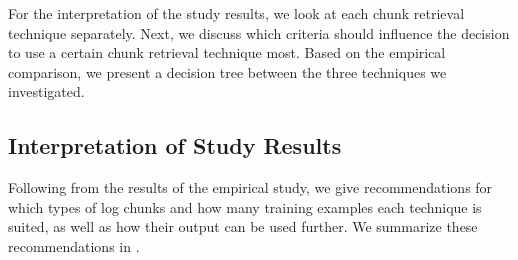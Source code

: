 For the interpretation of the study results, we look at each chunk
retrieval technique separately.
Next, we discuss
which criteria should influence the decision to use a certain
chunk retrieval technique most.
Based on the empirical comparison, we present a
decision tree between the three techniques we investigated.

\subsection{Interpretation of Study Results}
Following from the results of the empirical study,
we give recommendations for
which types of log chunks and how many training examples
each technique is suited, as well as
how their output can be used further.
We summarize these recommendations in
.

\begin{table}[tbp]
\caption{Recommendations for each of the investigated chunk retrieval
techniques.}
\label{tab:single-technique-recommendations}
\end{table}

